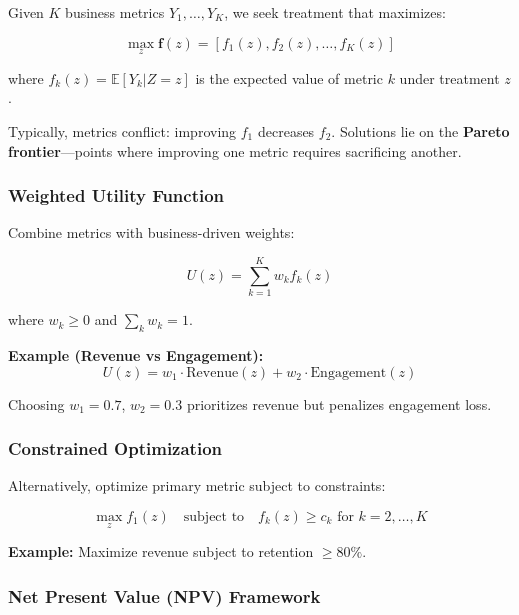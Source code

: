 Given $K$ business metrics $Y_1, \ldots, Y_K$, we seek treatment that maximizes:

\begin{equation}
\max_z \mathbf{f}(z) = [f_1(z), f_2(z), \ldots, f_K(z)]
\end{equation}

where $f_k(z) = \mathbb{E}[Y_k | Z = z]$ is the expected value of metric $k$ under treatment $z$.

Typically, metrics conflict: improving $f_1$ decreases $f_2$. Solutions lie on the \textbf{Pareto frontier}---points where improving one metric requires sacrificing another.

\subsubsection{Weighted Utility Function}

Combine metrics with business-driven weights:

\begin{equation}
U(z) = \sum_{k=1}^{K} w_k f_k(z)
\end{equation}

where $w_k \geq 0$ and $\sum_k w_k = 1$.

\textbf{Example (Revenue vs Engagement):}
\begin{equation}
U(z) = w_1 \cdot \text{Revenue}(z) + w_2 \cdot \text{Engagement}(z)
\end{equation}

Choosing $w_1 = 0.7$, $w_2 = 0.3$ prioritizes revenue but penalizes engagement loss.

\subsubsection{Constrained Optimization}

Alternatively, optimize primary metric subject to constraints:

\begin{equation}
\max_z f_1(z) \quad \text{subject to} \quad f_k(z) \geq c_k \text{ for } k = 2, \ldots, K
\end{equation}

\textbf{Example:} Maximize revenue subject to retention $\geq 80\%$.

\subsubsection{Net Present Value (NPV) Framework}

